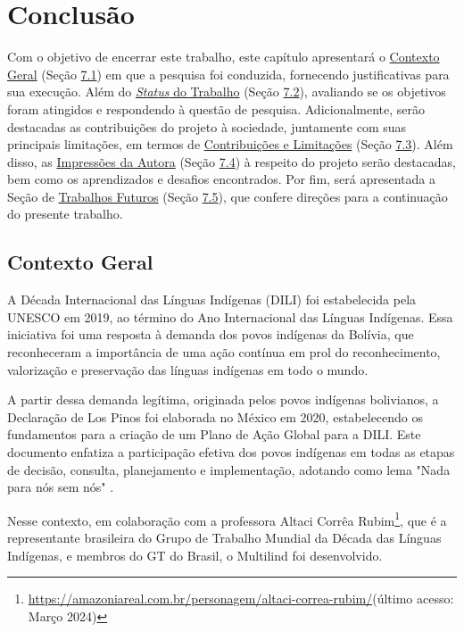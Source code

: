 \chapter[Conclusão]{Conclusão}
\label{chap:Conclusão}
Com o objetivo de encerrar este trabalho, este capítulo apresentará o \hyperref[sec:Contexto Geral]{Contexto Geral} (Seção \hyperref[sec:Contexto Geral]{7.1}) 
em que a pesquisa foi conduzida, fornecendo justificativas para sua execução. Além do \hyperref[sec:Status do Trabalho]{\textit{Status} 
do Trabalho} (Seção \hyperref[sec:Status do Trabalho]{7.2}), avaliando se os objetivos foram atingidos e respondendo à questão de pesquisa. Adicionalmente, 
serão destacadas as contribuições do projeto à sociedade, juntamente com suas principais limitações, em termos de 
\hyperref[sec:Contribuições e Limitações]{Contribuições e Limitações} (Seção \hyperref[sec:Contexto Geral]{7.3}). Além disso, as \hyperref[sec:Impressões da Autora]{Impressões da Autora} 
(Seção \hyperref[sec:Impressões da Autora]{7.4}) à respeito do projeto serão destacadas, bem como os aprendizados e desafios encontrados. Por fim, será apresentada a Seção de 
\hyperref[sec:Trabalhos Futuros]{Trabalhos Futuros} (Seção \hyperref[sec:Trabalhos Futuros]{7.5}), 
que confere direções para a continuação do presente trabalho.

\section{Contexto Geral}
\label{sec:Contexto Geral}
A Década Internacional das Línguas Indígenas (DILI) foi estabelecida pela UNESCO em 2019, ao término do Ano Internacional das Línguas 
Indígenas. Essa iniciativa foi uma resposta à demanda dos povos indígenas da Bolívia, que reconheceram a importância de uma ação contínua em prol do reconhecimento, 
valorização e preservação das línguas indígenas em todo o mundo. 

A partir dessa demanda legítima, originada pelos povos indígenas bolivianos, a Declaração de Los Pinos foi elaborada no México em 2020, estabelecendo os fundamentos 
para a criação de um Plano de Ação Global para a DILI. Este documento enfatiza a participação efetiva dos povos indígenas em todas as etapas de decisão, consulta, 
planejamento e implementação, adotando como lema "Nada para nós sem nós" \cite{gtbrasil2024}.

Nesse contexto, em colaboração com a professora Altaci Corrêa Rubim\footnote{\url{https://amazoniareal.com.br/personagem/altaci-correa-rubim/}(último acesso: Março 2024)}, 
que é a representante brasileira do Grupo de Trabalho Mundial da Década das Línguas Indígenas, e membros do GT do Brasil, o Multilind foi desenvolvido. 

